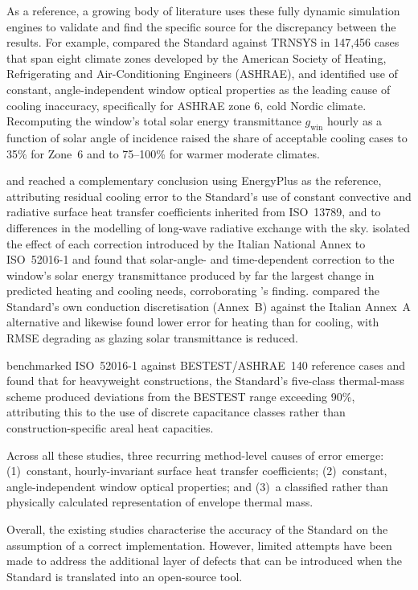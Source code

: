 \documentclass[12pt, a4paper]{article}
\begin{document}
As a reference, a growing body of literature uses these fully dynamic simulation engines to validate and find the specific source for the discrepancy between the results.
For example, \cite{zakula2021} compared the Standard against TRNSYS in 147,456 cases
that span eight climate zones developed by the American Society of Heating, Refrigerating and Air-Conditioning Engineers (ASHRAE), and identified use of constant,
angle-independent window optical properties as the leading cause of cooling
inaccuracy, specifically for ASHRAE zone 6, cold Nordic climate.
Recomputing the window's total solar energy transmittance $g_{\text{win}}$ hourly
as a function of solar angle of incidence raised the share of acceptable
cooling cases to 35\% for Zone~6 and to 75--100\% for warmer moderate climates.
 
\cite{ballarini2020} and \cite{ballarini2019} reached a complementary conclusion
using EnergyPlus as the reference, attributing residual cooling error to the
Standard's use of constant convective and radiative surface heat transfer
coefficients inherited from ISO~13789, and to differences in the modelling of
long-wave radiative exchange with the sky.
\cite{deluca2022} isolated the effect of each correction introduced by the Italian
National Annex to ISO~52016-1 and found that solar-angle- and time-dependent
correction to the window's solar energy transmittance produced by far the largest
change in predicted heating and cooling needs, corroborating \cite{zakula2021}'s
finding.
\cite{summa2022} compared the Standard's own conduction discretisation (Annex~B)
against the Italian Annex~A alternative and likewise found lower error for heating
than for cooling, with RMSE degrading as glazing solar transmittance is reduced.

\cite{campana2019} benchmarked ISO~52016-1 against BESTEST/ASHRAE~140 reference
cases and found that for heavyweight constructions, the Standard's five-class
thermal-mass scheme produced deviations from the BESTEST range exceeding 90\%,
attributing this to the use of discrete capacitance classes rather than
construction-specific areal heat capacities.

Across all these studies, three recurring method-level causes of error emerge:
(1)~constant, hourly-invariant surface heat transfer coefficients; (2)~constant,
angle-independent window optical properties; and (3)~a classified rather than
physically calculated representation of envelope thermal mass.
 
 
Overall, the existing studies characterise the accuracy of the Standard on the assumption
of a correct implementation.
However, limited attempts have been made to address the additional layer of defects that can be introduced when the Standard is translated into an open-source tool.
\end{document}
